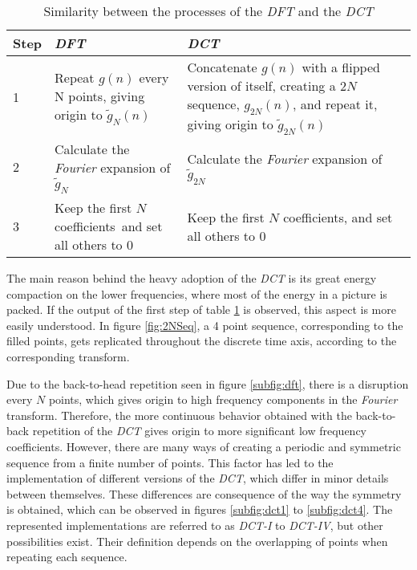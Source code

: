 \begin{table}[h]
    \centering
    \begin{tabular}{@{}lllll@{}} \toprule
        \textbf{Step} &      \multicolumn{2}{l}{\textbf{\emph{DFT}}} &      \multicolumn{2}{l}{\textbf{\emph{DCT}}} \\ \hline
        1 &         \multicolumn{2}{p{0.4\textwidth}}{Repeat $g(n)$ every N points, giving origin to $\widetilde{g}_N(n)$} &         \multicolumn{2}{p{0.4\textwidth}}{Concatenate $g(n)$ with a flipped version of itself, creating a $2N$ sequence, $g_{2N}(n)$, and repeat it, giving origin to $\widetilde{g}_{2N}(n)$}\\ \hline
        2 &         \multicolumn{2}{p{0.4\textwidth}}{Calculate the \emph{Fourier} expansion of $\widetilde{g}_N$} &         \multicolumn{2}{p{0.4\textwidth}}{Calculate the \emph{Fourier} expansion of $\widetilde{g}_{2N}$}\\ \hline
        3 &         \multicolumn{2}{p{0.4\textwidth}}{Keep the first $N$ coefficients\, and set all others to $0$} &         \multicolumn{2}{p{0.4\textwidth}}{Keep the first $N$ coefficients, and set all others to $0$}\\ 
        \bottomrule
    \end{tabular}
    \caption{Similarity between the processes of the        \emph{DFT} and the \emph{DCT}}
    \label{tab:DFTDCT}
\end{table}

The main reason behind the heavy adoption of the \emph{DCT} is its great energy compaction on the lower frequencies, where most of the energy in a picture is packed. If the output of the first step of table \ref{tab:DFTDCT} is observed, this aspect is more easily understood. In figure \ref{fig:2NSeq}, a 4 point sequence, corresponding to the filled points, gets replicated throughout the discrete time axis, according to the corresponding transform.

Due to the back-to-head repetition seen in figure \ref{subfig:dft}, there is a disruption every $N$ points, which gives origin to high frequency components in the \emph{Fourier} transform. Therefore, the more continuous behavior obtained with the back-to-back repetition of the \emph{DCT} gives origin to more significant low frequency coefficients. However, there are many ways of creating a periodic and symmetric sequence from a finite number of points. This factor has led to the implementation of different versions of the \emph{DCT}, which differ in minor details between themselves. These differences are consequence of the way the symmetry is obtained, which can be observed in figures \ref{subfig:dct1} to \ref{subfig:dct4}. The represented implementations are referred to as \emph{DCT-I} to \emph{DCT-IV}, but other possibilities exist. Their definition depends on the overlapping of points when repeating each sequence.

